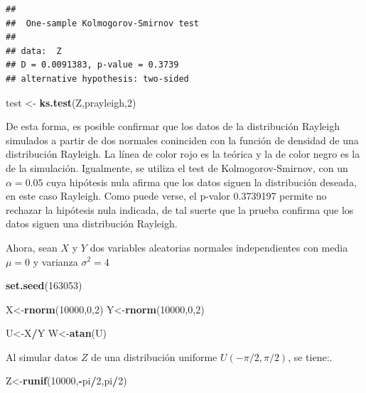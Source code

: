 \documentclass[]{article}
\newenvironment{Shaded}{\begin{snugshade}}{\end{snugshade}}
\newcommand{\KeywordTok}[1]{\textcolor[rgb]{0.13,0.29,0.53}{\textbf{#1}}}
\newcommand{\DecValTok}[1]{\textcolor[rgb]{0.00,0.00,0.81}{#1}}
\newcommand{\StringTok}[1]{\textcolor[rgb]{0.31,0.60,0.02}{#1}}
\newcommand{\OperatorTok}[1]{\textcolor[rgb]{0.81,0.36,0.00}{\textbf{#1}}}
\newcommand{\NormalTok}[1]{#1}
\begin{document}
\begin{verbatim}
## 
##  One-sample Kolmogorov-Smirnov test
## 
## data:  Z
## D = 0.0091383, p-value = 0.3739
## alternative hypothesis: two-sided
\end{verbatim}

\begin{Shaded}
\begin{Highlighting}[]
\NormalTok{test <-}\StringTok{ }\KeywordTok{ks.test}\NormalTok{(Z,prayleigh,}\DecValTok{2}\NormalTok{)}
\end{Highlighting}
\end{Shaded}

De esta forma, es posible confirmar que los datos de la distribución
Rayleigh simulados a partir de dos normales coninciden con la función de
densidad de una distribución Rayleigh. La línea de color rojo es la
teórica y la de color negro es la de la simulación. Igualmente, se
utiliza el test de Kolmogorov-Smirnov, con un \(\alpha=0.05\) cuya
hipótesis nula afirma que los datos siguen la distribución deseada, en
este caso Rayleigh. Como puede verse, el p-valor 0.3739197 permite no
rechazar la hipótesis nula indicada, de tal suerte que la prueba
confirma que los datos siguen una distribución Rayleigh.

Ahora, sean \(X\) y \(Y\) dos variables aleatorias normales
independientes con media \(\mu=0\) y varianza \(\sigma^2=4\)

\begin{Shaded}
\begin{Highlighting}[]
\KeywordTok{set.seed}\NormalTok{(}\DecValTok{163053}\NormalTok{)}

\NormalTok{X<-}\KeywordTok{rnorm}\NormalTok{(}\DecValTok{10000}\NormalTok{,}\DecValTok{0}\NormalTok{,}\DecValTok{2}\NormalTok{)}
\NormalTok{Y<-}\KeywordTok{rnorm}\NormalTok{(}\DecValTok{10000}\NormalTok{,}\DecValTok{0}\NormalTok{,}\DecValTok{2}\NormalTok{)}

\NormalTok{U<-X}\OperatorTok{/}\NormalTok{Y}
\NormalTok{W<-}\KeywordTok{atan}\NormalTok{(U)}
\end{Highlighting}
\end{Shaded}

Al simular datos \(Z\) de una distribución uniforme \(U(-\pi/2,\pi/2)\),
se tiene:.

\begin{Shaded}
\begin{Highlighting}[]
\NormalTok{Z<-}\KeywordTok{runif}\NormalTok{(}\DecValTok{10000}\NormalTok{,}\OperatorTok{-}\NormalTok{pi}\OperatorTok{/}\DecValTok{2}\NormalTok{,pi}\OperatorTok{/}\DecValTok{2}\NormalTok{)}
\end{Highlighting}
\end{Shaded}
\end{document}
